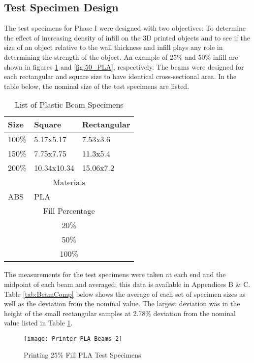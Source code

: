 \subsection{Test Specimen Design}
	The test specimens for Phase I were designed with two objectives: To determine the effect of increasing density of infill on the 3D printed objects and to see if the size of an object relative to the wall thickness and infill plays any role in determining the strength of the object. An example of 25\% and 50\% infill are shown in figures \ref{fig:25_PLA} and \ref{fig:50_PLA}, respectively. The beams were designed for each rectangular and square size to have identical cross-sectional area. In the table below, the nominal size of the test specimens are listed.
	\begin{table} [H]
		\centering
		\begin{tabular}{ l l l }
		\noalign{\hrule height 2pt}
		Size & Square & Rectangular \\ \hline
		100\% & 5.17x5.17 & 7.53x3.6 \\
		150\% & 7.75x7.75 & 11.3x5.4 \\
		200\% & 10.34x10.34 & 15.06x7.2 \\ \hline
		\multicolumn{3}{c}{Materials} \\ \hline
		ABS & PLA \\ \hline
		\multicolumn{3}{c}{Fill Percentage} \\ \hline
		\multicolumn{3}{c}{20\%} \\
		\multicolumn{3}{c}{50\%} \\
		\multicolumn{3}{c}{100\%} \\ \hline
		\end{tabular}
		\caption{List of Plastic Beam Specimens}
		\label{tab:BeamFab}
	\end{table}

	The measurements for the test specimens were taken at each end and the midpoint of each beam and averaged; this data is available in Appendices B \& C. Table \ref{tab:BeamComp} below shows the average of each set of specimen sizes as well as the deviation from the nominal value. The largest deviation was in the height of the small rectangular samples at 2.78\% deviation from the nominal value listed in Table \ref{tab:BeamFab}.
	
	\begin{figure} [H]
		\centering
		\caption{Printing 25\% Fill PLA Test Specimens}
		\texttt{[image: Printer\_PLA\_Beams\_2]}
		\label{fig:25_PLA}
	\end{figure}
	
